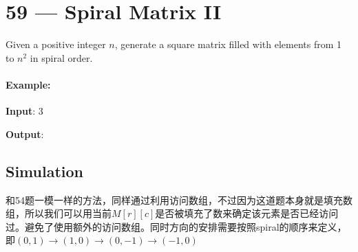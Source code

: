 \section{59 --- Spiral Matrix II}
Given a positive integer $n$, generate a square matrix filled with elements from 1 to $n^2$ in spiral order.
\paragraph{Example:}
\begin{flushleft}
\textbf{Input}: 3
\par
\textbf{Output}:
\begin{figure}[H]
\end{figure}
\end{flushleft}
\subsection{Simulation}
和54题一模一样的方法，同样通过利用访问数组，不过因为这道题本身就是填充数组，所以我们可以用当前$M[r][c]$是否被填充了数来确定该元素是否已经访问过。避免了使用额外的访问数组。同时方向的安排需要按照spiral的顺序来定义，即$(0,1)\to(1,0)\to(0,-1)\to(-1,0)$